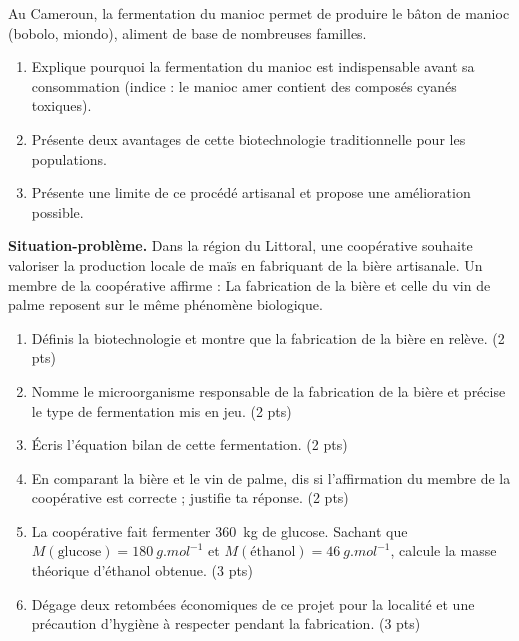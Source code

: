 \documentclass[11pt]{article}
\newcounter{popsec}
\newcounter{popsub}
\newcommand{\courssub}[1]{%
  \stepcounter{popsub}%
  \par\vspace{9pt}\noindent{\popxbold\fontsize{11.5}{13}\selectfont\color{popink}{\color{poporange}\thepopsec.\thepopsub}\hspace{6pt}#1}\par\nopagebreak\vspace{4pt}
}
\begin{document}
\begin{exercice}
Au Cameroun, la fermentation du manioc permet de produire le \og bâton de manioc \fg{} (bobolo, miondo), aliment de base de nombreuses familles.
\begin{enumerate}
\item Explique pourquoi la fermentation du manioc est indispensable avant sa consommation (indice : le manioc amer contient des composés cyanés toxiques).
\item Présente deux avantages de cette biotechnologie traditionnelle pour les populations.
\item Présente une limite de ce procédé artisanal et propose une amélioration possible.
\end{enumerate}
\end{exercice}

\courssub{Je me prépare au Probatoire}

\begin{exercice}
\textbf{Situation-problème.} Dans la région du Littoral, une coopérative souhaite valoriser la production locale de maïs en fabriquant de la bière artisanale. Un membre de la coopérative affirme : \og La fabrication de la bière et celle du vin de palme reposent sur le même phénomène biologique. \fg{}

\begin{enumerate}
\item Définis la biotechnologie et montre que la fabrication de la bière en relève. \hfill (2 pts)
\item Nomme le microorganisme responsable de la fabrication de la bière et précise le type de fermentation mis en jeu. \hfill (2 pts)
\item Écris l'équation bilan de cette fermentation. \hfill (2 pts)
\item En comparant la bière et le vin de palme, dis si l'affirmation du membre de la coopérative est correcte ; justifie ta réponse. \hfill (2 pts)
\item La coopérative fait fermenter \SI{360}{kg} de glucose. Sachant que $M(\text{glucose}) = \SI{180}{g.mol^{-1}}$ et $M(\text{éthanol}) = \SI{46}{g.mol^{-1}}$, calcule la masse théorique d'éthanol obtenue. \hfill (3 pts)
\item Dégage deux retombées économiques de ce projet pour la localité et une précaution d'hygiène à respecter pendant la fabrication. \hfill (3 pts)
\end{enumerate}
\end{exercice}
\end{document}
